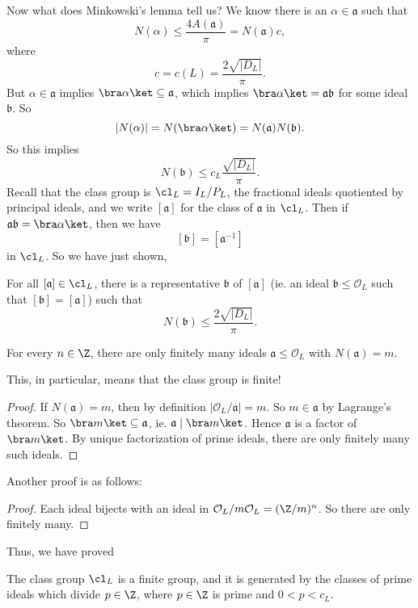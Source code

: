 \documentclass[a4paper]{article}
\begin{document}
Now what does Minkowski's lemma tell us? We know there is an $\alpha \in \mathfrak{a}$ such that
\[
  N(\alpha) \leq \frac{4A(\mathfrak{a})}{\pi} = N(\mathfrak{a}) c,
\]
where
\[
  c = c(L) = \frac{2\sqrt{|D_L|}}{\pi}.
\]
But $\alpha \in \mathfrak{a}$ implies $\bra \alpha\ket \subseteq \mathfrak{a}$, which implies $\bra \alpha\ket = \mathfrak{a} \mathfrak{b}$ for some ideal $\mathfrak{b}$. So
\[
  |N(\alpha)| = N(\bra \alpha\ket) = N(\mathfrak{a})N(\mathfrak{b}).
\]
So this implies
\[
  N(\mathfrak{b}) \leq c_L \frac{\sqrt{|D_L|}}{\pi}.
\]
Recall that the class group is $\cl_L = I_L/P_L$, the fractional ideals quotiented by principal ideals, and we write $[\mathfrak{a}]$ for the class of $\mathfrak{a}$ in $\cl_L$. Then if $\mathfrak{a}\mathfrak{b} = \bra \alpha\ket$, then we have
\[
  [\mathfrak{b}] = [\mathfrak{a}^{-1}]
\]
in $\cl_L$. So we have just shown,
\begin{prop}
  For all $[\mathfrak{a}] \in \cl_L$, there is a representative $\mathfrak{b}$ of $[\mathfrak{a}]$ (ie. an ideal $\mathfrak{b} \leq \mathcal{O}_L$ such that $[\mathfrak{b}] = [\mathfrak{a}]$) such that
  \[
    N(\mathfrak{b}) \leq \frac{2\sqrt{|D_L|}}{\pi}.
  \]
\end{prop}

\begin{lemma}
  For every $n \in \Z$, there are only finitely many ideals $\mathfrak{a} \leq \mathcal{O}_L$ with $N(\mathfrak{a}) = m$.
\end{lemma}
This, in particular, means that the class group is finite!

\begin{proof}
  If $N(\mathfrak{a}) = m$, then by definition $|\mathcal{O}_L/\mathfrak{a}| = m$. So $m \in \mathfrak{a}$ by Lagrange's theorem. So $\bra m \ket \subseteq \mathfrak{a}$, ie. $\mathfrak{a} \mid \bra m\ket$. Hence $\mathfrak{a}$ is a factor of $\bra m\ket$. By unique factorization of prime ideals, there are only finitely many such ideals.
\end{proof}

Another proof is as follows:
\begin{proof}
  Each ideal bijects with an ideal in $\mathcal{O}_L/m\mathcal{O}_L = (\Z/m)^n$. So there are only finitely many.
\end{proof}

Thus, we have proved
\begin{thm}
  The class group $\cl_L$ is a finite group, and it is generated by the classes of prime ideals which divide $p \in \Z$, where $p \in \Z$ is prime and $0 < p < c_L$.
\end{thm}
\end{document}
